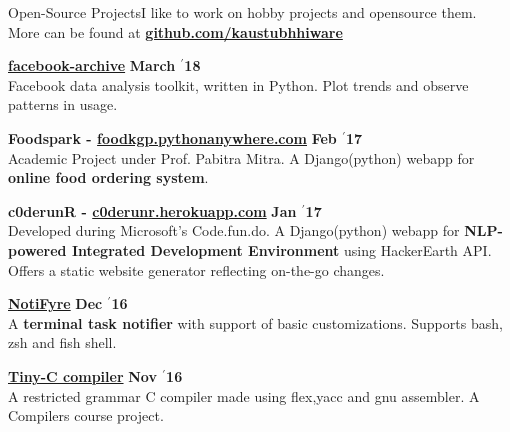 \documentclass{resume} %
\begin{document}




\begin{rSection}{\large Open-Source Projects}{}{I like to work on hobby projects and opensource them. More can be found at \textbf{\href{https://github.com/kaustubhhiware}{github.com/kaustubhhiware}}}

{\bf \large \href{https://github.com/kaustubhhiware/facebook-archive}{facebook-archive}} \hfill \textbf{March $^{\prime}$18} \\ 
Facebook data analysis toolkit, written in Python. Plot trends and observe patterns in usage.

{\bf \large Foodspark - \url{foodkgp.pythonanywhere.com}} \hfill \textbf{Feb $^{\prime}$17} \\ 
Academic Project under Prof. Pabitra Mitra. A Django(python) webapp for \textbf{online food ordering system}.

{\bf \large c0derunR - \url{c0derunr.herokuapp.com}} \hfill \textbf{Jan $^{\prime}$17} \\ 
Developed during Microsoft's Code.fun.do. A Django(python) webapp for \textbf{NLP-powered Integrated Development Environment} using HackerEarth API. Offers a static website generator reflecting on-the-go changes.

{\bf \large \href{https://github.com/kaustubhhiware/NotiFyre}{NotiFyre}} \hfill \textbf{Dec $^{\prime}$16} \\ 
A \textbf{terminal task notifier} with support of basic customizations. Supports bash, zsh and fish shell.

{\bf \large \href{https://github.com/kaustubhhiware/cOMPILER}{Tiny-C compiler}} \hfill \textbf{Nov $^{\prime}$16} \\ 
A restricted grammar C compiler made using flex,yacc and gnu assembler. A Compilers course project.



\end{rSection}
\end{document}
